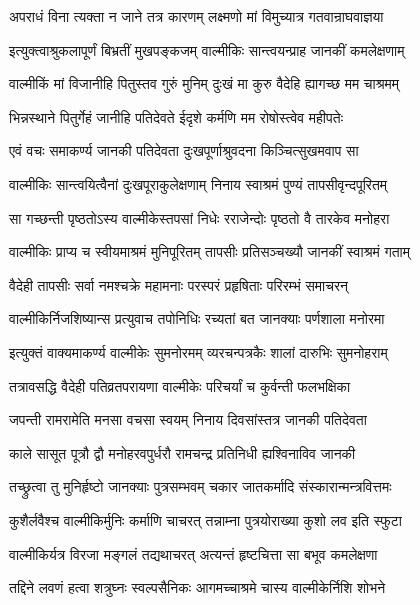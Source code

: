 \twolineshloka
{अपराधं विना त्यक्ता न जाने तत्र कारणम्}
{लक्ष्मणो मां विमुच्यात्र गतवान्राघवाज्ञया}%

\twolineshloka
{इत्युक्त्वाश्रुकलापूर्णं बिभ्रतीं मुखपङ्कजम्}
{वाल्मीकिः सान्त्वयन्प्राह जानकीं कमलेक्षणाम्}%

\twolineshloka
{वाल्मीकिं मां विजानीहि पितुस्तव गुरुं मुनिम्}
{दुःखं मा कुरु वैदेहि ह्यागच्छ मम चाश्रमम्}%

\twolineshloka
{भिन्नस्थाने पितुर्गेहं जानीहि पतिदेवते}
{ईदृशे कर्मणि मम रोषोस्त्वेव महीपतेः}%

\twolineshloka
{एवं वचः समाकर्ण्य जानकी पतिदेवता}
{दुःखपूर्णाश्रुवदना किञ्चित्सुखमवाप सा}%


\twolineshloka
{वाल्मीकिः सान्त्वयित्वैनां दुःखपूराकुलेक्षणाम्}
{निनाय स्वाश्रमं पुण्यं तापसीवृन्दपूरितम्}%

\twolineshloka
{सा गच्छन्ती पृष्ठतोऽस्य वाल्मीकेस्तपसां निधेः}
{रराजेन्दोः पृष्ठतो वै तारकेव मनोहरा}%

\twolineshloka
{वाल्मीकिः प्राप्य च स्वीयमाश्रमं मुनिपूरितम्}
{तापसीः प्रतिसञ्चख्यौ जानकीं स्वाश्रमं गताम्}%

\twolineshloka
{वैदेही तापसीः सर्वा नमश्चक्रे महामनाः}
{परस्परं प्रहृषिताः परिरम्भं समाचरन्}%

\twolineshloka
{वाल्मीकिर्निजशिष्यान्स प्रत्युवाच तपोनिधिः}
{रच्यतां बत जानक्याः पर्णशाला मनोरमा}%

\twolineshloka
{इत्युक्तं वाक्यमाकर्ण्य वाल्मीकेः सुमनोरमम्}
{व्यरचन्पत्रकैः शालां दारुभिः सुमनोहराम्}%

\twolineshloka
{तत्रावसद्धि वैदेही पतिव्रतपरायणा}
{वाल्मीकेः परिचर्यां च कुर्वन्ती फलभक्षिका}%

\twolineshloka
{जपन्ती रामरामेति मनसा वचसा स्वयम्}
{निनाय दिवसांस्तत्र जानकी पतिदेवता}%

\twolineshloka
{काले सासूत पूत्रौ द्वौ मनोहरवपुर्धरौ}
{रामचन्द्र प्रतिनिधी ह्यश्विनाविव जानकी}%

\twolineshloka
{तच्छ्रुत्वा तु मुनिर्हृष्टो जानक्याः पुत्रसम्भवम्}
{चकार जातकर्मादि संस्कारान्मन्त्रवित्तमः}%

\twolineshloka
{कुशैर्लवैश्च वाल्मीकिर्मुनिः कर्माणि चाचरत्}
{तन्नाम्ना पुत्रयोराख्या कुशो लव इति स्फुटा}%

\twolineshloka
{वाल्मीकिर्यत्र विरजा मङ्गलं तद्यथाचरत्}
{अत्यन्तं हृष्टचित्ता सा बभूव कमलेक्षणा}%

\twolineshloka
{तद्दिने लवणं हत्वा शत्रुघ्नः स्वल्पसैनिकः}
{आगमच्चाश्रमे चास्य वाल्मीकेर्निशि शोभने}%


